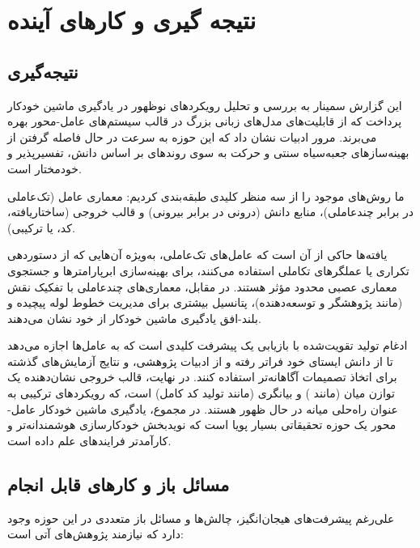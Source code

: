 
\chapter{نتیجه گیری و کارهای آینده}
\thispagestyle{empty}
\section{نتیجه‌گیری}
این گزارش سمینار به بررسی و تحلیل رویکردهای نوظهور در یادگیری ماشین خودکار پرداخت که از قابلیت‌های مدل‌های زبانی بزرگ در قالب سیستم‌های عامل-محور بهره می‌برند. مرور ادبیات نشان داد که این حوزه به سرعت در حال فاصله گرفتن از بهینه‌سازهای جعبه‌سیاه سنتی و حرکت به سوی روندهای بر اساس دانش، تفسیرپذیر و خودمختار است.

ما روش‌های موجود را از سه منظر کلیدی طبقه‌بندی کردیم: معماری عامل (تک‌عاملی در برابر چندعاملی)، منابع دانش (درونی در برابر بیرونی) و قالب خروجی (ساختاریافته، کد، یا ترکیبی).

یافته‌ها حاکی از آن است که عامل‌های تک‌عاملی، به‌ویژه آن‌هایی که از دستوردهی تکراری یا عملگرهای تکاملی استفاده می‌کنند، برای بهینه‌سازی ابرپارامترها و جستجوی معماری عصبی محدود مؤثر هستند. در مقابل، معماری‌های چندعاملی با تفکیک نقش (مانند پژوهشگر و توسعه‌دهنده)، پتانسیل بیشتری برای مدیریت خطوط لوله پیچیده و بلند-افق یادگیری ماشین خودکار از خود نشان می‌دهند.

ادغام تولید تقویت‌شده با بازیابی یک پیشرفت کلیدی است که به عامل‌ها اجازه می‌دهد تا از دانش ایستای خود فراتر رفته و از ادبیات پژوهشی،  و نتایج آزمایش‌های گذشته برای اتخاذ تصمیمات آگاهانه‌تر استفاده کنند. در نهایت، قالب خروجی نشان‌دهنده یک توازن میان  (مانند ) و بیانگری (مانند تولید کد کامل) است، که رویکردهای ترکیبی به عنوان راه‌حلی میانه در حال ظهور هستند. در مجموع، یادگیری ماشین خودکار عامل-محور یک حوزه تحقیقاتی بسیار پویا است که نویدبخش خودکارسازی هوشمندانه‌تر و کارآمدتر فرایندهای علم داده است.

\section{مسائل باز و کارهای قابل انجام}
علی‌رغم پیشرفت‌های هیجان‌انگیز، چالش‌ها و مسائل باز متعددی در این حوزه وجود دارد که نیازمند پژوهش‌های آتی است:

